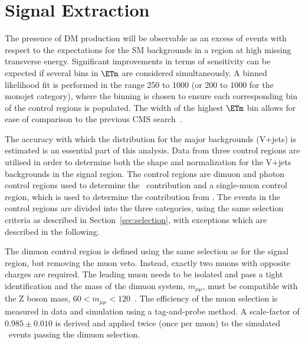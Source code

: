 \section{Signal Extraction}
The presence of DM production will be observable as an excess of events with respect to the expectations for the 
SM backgrounds in a region at high missing transverse energy. Significant improvements in terms of sensitivity can be expected if 
several bins in $\ETm$ are considered simultaneously. 
A binned likelihood fit is performed in the range 250 \gev to 1000 \gev (or 200 \gev to 1000 \gev 
for the monojet category), where the binning is chosen to ensure each corresponding bin of the control regions  
is populated. The width of the highest $\ETm$ bin allows for ease of comparison to the previous CMS search~\cite{monojet1}. 

The accuracy with which the distribution for the major backgrounds (V+jets) is estimated is an essential part of this analysis. 
Data from three control regions are utilised in order to determine both the shape and normalization for the V+jets backgrounds in 
the signal region. The control regions are dimuon and photon control regions used to determine the \Zvvjets~contribution and a single-muon 
control region, which is used to determine the contribution from \Wlvjets. The events in the control regions are divided into the three 
categories, using the same selection criteria as described in Section~\ref{sec:selection}, with exceptions which are described in the following. 

The dimuon control region is defined using the same selection as for the signal region, 
but removing the muon veto. Instead, exactly two muons with opposite charges are 
required. The leading \pt muon needs to be isolated and pass a tight identification and 
the mass of the dimuon system, $m_{\mu\mu}$,  must be compatible with the Z boson mass, 
$60<m_{\mu\mu}<120$~\gev. The efficiency of the muon selection is measured 
in data and simulation using a tag-and-probe method. A scale-factor of $0.985\pm0.010$ is derived 
and applied twice (once per muon) to the simulated \Zjets~events passing the dimuon selection.

